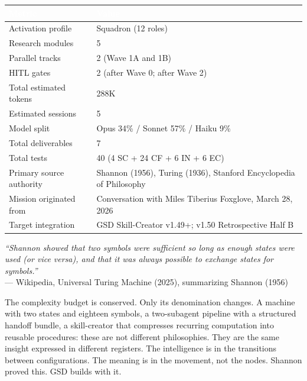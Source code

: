 \documentclass[11pt,letterpaper]{article}
\newcommand{\tableheader}[1]{\textbf{\sffamily\textcolor{white}{#1}}}
\begin{document}
\begin{center}
\begin{tabularx}{\textwidth}{L{5.5cm}X}
\toprule
{}
\tableheader{Metric} & \tableheader{Value} \\
\midrule
Activation profile & Squadron (12 roles) \\
Research modules & 5 \\
Parallel tracks & 2 (Wave 1A and 1B) \\
HITL gates & 2 (after Wave 0; after Wave 2) \\
Total estimated tokens & 288K \\
Estimated sessions & 5 \\
Model split & Opus 34\% / Sonnet 57\% / Haiku 9\% \\
Total deliverables & 7 \\
Total tests & 40 (4 SC + 24 CF + 6 IN + 6 EC) \\
Primary source authority & Shannon (1956), Turing (1936), Stanford Encyclopedia of Philosophy \\
Mission originated from & Conversation with Miles Tiberius Foxglove, March 28, 2026 \\
Target integration & GSD Skill-Creator v1.49+; v1.50 Retrospective Half B \\
\bottomrule
\end{tabularx}
\end{center}

\vspace{2em}

\begin{quotebox}
\textit{``Shannon showed that two symbols were sufficient so long as enough states were used (or vice versa), and that it was always possible to exchange states for symbols.''} \\[0.5em]
\hfill --- Wikipedia, Universal Turing Machine (2025), summarizing Shannon (1956)

\vspace{1em}
The complexity budget is conserved. Only its denomination changes. A machine with two states and eighteen symbols, a two-subagent pipeline with a structured handoff bundle, a skill-creator that compresses recurring computation into reusable procedures: these are not different philosophies. They are the same insight expressed in different registers. The intelligence is in the transitions between configurations. The meaning is in the movement, not the nodes. Shannon proved this. GSD builds with it.
\end{quotebox}
\end{document}
